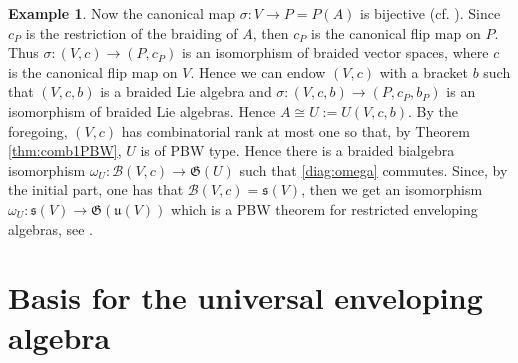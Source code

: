\documentclass[english]{amsart}
\numberwithin{equation}{section}
\numberwithin{figure}{section}
\theoremstyle{plain}
\theoremstyle{definition}
\theoremstyle{definition}
\newtheorem{example}[thm]{Example}
\theoremstyle{remark}
\theoremstyle{remark}
\theoremstyle{plain}
\theoremstyle{plain}
\theoremstyle{plain}
\begin{document}
\begin{example}
Now the canonical map $\sigma:V\rightarrow P=P\left(A\right)$ is
bijective (cf. \cite[Theorem 6.11]{Milnor-Moore}). Since $c_{P}$
is the restriction of the braiding of $A$, then $c_{P}$ is the canonical
flip map on $P$. Thus $\sigma:(V,c)\rightarrow(P,c_{P})$ is an isomorphism
of braided vector spaces, where $c$ is the canonical flip map on
$V$. Hence we can endow $(V,c)$ with a bracket $b$ such that $(V,c,b)$
is a braided Lie algebra and $\sigma:(V,c,b)\rightarrow(P,c_{P},b_{P})$
is an isomorphism of braided Lie algebras. Hence $A\cong U:=U\left(V,c,b\right)$.
By the foregoing, $(V,c)$ has combinatorial rank at most one so that,
by Theorem \ref{thm:comb1PBW}, $U$ is of PBW type. Hence there is
a braided bialgebra isomorphism $\omega_{U}:\mathcal{B}\left(V,c\right)\rightarrow\mathfrak{G}\left(U\right)$
such that \eqref{diag:omega} commutes. Since, by the initial part,
one has that $\mathcal{B}\left(V,c\right)=\mathfrak{s}(V)$, then
we get an isomorphism $\omega_{U}:\mathfrak{s}(V)\rightarrow\mathfrak{G}\left(\mathfrak{u}(V)\right)$
which is a PBW theorem for restricted enveloping algebras, see \cite[Proposition 6.12]{Milnor-Moore}. 
\end{example}
\section{Basis for the universal enveloping algebra \label{sec:PBWbasis}}
\end{document}
